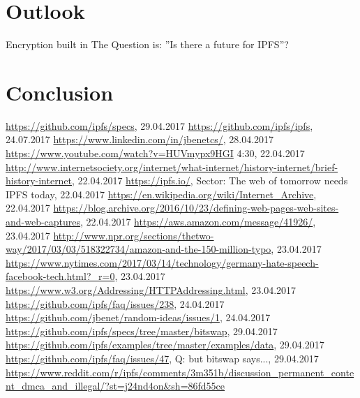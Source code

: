 \documentclass[a4paper,11pt, oneside]{report}
\theoremstyle{definition}
\begin{document}
\chapter{Outlook}
Encryption built in
The Question is: ''Is there a future for IPFS''?

\chapter{Conclusion}



\begin{thebibliography}{1}
 \url{https://github.com/ipfs/specs}, 29.04.2017
 \url{https://github.com/ipfs/ipfs}, 24.07.2017
 \url{https://www.linkedin.com/in/jbenetcs/}, 28.04.2017
 \url{https://www.youtube.com/watch?v=HUVmypx9HGI} 4:30, 22.04.2017
 \url{http://www.internetsociety.org/internet/what-internet/history-internet/brief-history-internet}, 22.04.2017
 \url{https://ipfs.io/}, Sector: The web of tomorrow needs IPFS today, 22.04.2017
 \url{https://en.wikipedia.org/wiki/Internet_Archive}, 22.04.2017
 \url{https://blog.archive.org/2016/10/23/defining-web-pages-web-sites-and-web-captures}, 22.04.2017
 \url{https://aws.amazon.com/message/41926/}, 23.04.2017
 \url{http://www.npr.org/sections/thetwo-way/2017/03/03/518322734/amazon-and-the-150-million-typo}, 23.04.2017
 \url{https://www.nytimes.com/2017/03/14/technology/germany-hate-speech-facebook-tech.html?_r=0}, 23.04.2017
 \url{https://www.w3.org/Addressing/HTTPAddressing.html}, 23.04.2017 
\url{https://github.com/ipfs/faq/issues/238}, 24.04.2017
 \url{https://github.com/jbenet/random-ideas/issues/1}, 24.04.2017
 \url{https://github.com/ipfs/specs/tree/master/bitswap}, 29.04.2017
 \url{https://github.com/ipfs/examples/tree/master/examples/data}, 29.04.2017
 \url{https://github.com/ipfs/faq/issues/47}, Q: but bitswap says..., 29.04.2017
\url{https://www.reddit.com/r/ipfs/comments/3m351b/discussion_permanent_content_dmca_and_illegal/?st=j24nd4on&sh=86fd55ce}
 
\end{thebibliography}


\printglossaries

\listoffigures
\end{document}

